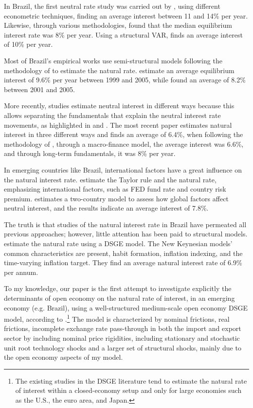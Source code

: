 \documentclass[12pt,oneside,a4paper]{article}
\begin{document}
In Brazil, the first neutral rate study was carried out by \citet{Kfoury:2003}, using different econometric techniques, finding an average interest between 11 and 14\% per year. Likewise, through various methodologies, \citet{Aurelio:2011} found that the median equilibrium interest rate was 8\% per year. Using a structural VAR, \citet{Borges:2006} finds an average interest of 10\% per year.

Most of Brazil's empirical works use semi-structural models following the methodology of \citet{LW:2003} to estimate the natural rate. \citet{Portugal:2009} estimate an average equilibrium interest of 9.6\% per year between 1999 and 2005, while \citet{Ribeiro:2013} found an average of 8.2\% between 2001 and 2005.

More recently, studies estimate neutral interest in different ways because this allows separating the fundamentals that explain the neutral interest rate movements, as highlighted in \citet{Gottlieb:2013} and \citet{Perrelli:2014}. The most recent paper \citet{Moreira:2019} estimates natural interest in three different ways and finds an average of 6.4\%, when following the methodology of \citet{HLW:2017}, through a macro-finance model, the average interest was 6.6\%, and through long-term fundamentals, it was 8\% per year.

In emerging countries like Brazil, international factors have a great influence on the natural interest rate. \citet{Barbosa:2016} estimate the Taylor rule and the natural rate, emphasizing international factors, such as FED fund rate and country risk premium. \citet{Candido:2018} estimates a two-country model to assess how global factors affect neutral interest, and the results indicate an average interest of 7.8\%.

The truth is that studies of the natural interest rate in Brazil have permeated all previous approaches; however, little attention has been paid to structural models. \citet{Palma:2017} estimate the natural rate using a DSGE model. The New Keynesian models' common characteristics are present, habit formation, inflation indexing, and the time-varying inflation target. They find an average natural interest rate of 6.9\%  per annum.

To my knowledge, our paper is the first attempt to investigate explicitly  the determinants of open economy on the natural rate of interest, in an emerging economy (e.g. Brazil), using a well-structured medium-scale open economy DSGE model, according to \citet{Adolfson:2007}.\footnote{The existing studies in the DSGE literature tend to estimate the natural rate of interest  within a closed-economy setup and only for large economies such as the U.S., the euro area, and Japan.} The model is characterized by nominal frictions, real frictions, incomplete exchange rate pass-through in both the import and export sector by including nominal price rigidities, including stationary and stochastic unit root technology shocks and a larger set of structural shocks, mainly due to the open economy aspects of my model.
\end{document}
